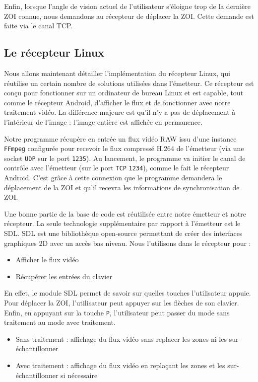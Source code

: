 \documentclass[11pt,a4paper]{article}
\begin{document}
\bigbreak
Enfin, lorsque l'angle de vision actuel de l'utilisateur s'éloigne trop de la dernière ZOI connue, nous demandons au récepteur de déplacer la ZOI.
Cette demande est faite via le canal TCP.

\subsection{Le récepteur Linux}
Nous allons maintenant détailler l'implémentation du récepteur Linux, qui réutilise un certain nombre de solutions utilisées dans l'émetteur.
Ce récepteur est conçu pour fonctionner sur un ordinateur de bureau Linux et est capable, tout comme le récepteur Android, d'afficher le flux et de fonctionner avec notre traitement vidéo.
La différence majeure est qu'il n'y a pas de déplacement à l'intérieur de l'image : l'image entière est affichée en permanence.

\bigbreak
Notre programme récupère en entrée un flux vidéo RAW issu d'une instance \texttt{FFmpeg} configurée pour recevoir le flux compressé H.264 de l'émetteur (via une socket \texttt{UDP} sur le port \texttt{1235}).
Au lancement, le programme va initier le canal de contrôle avec l'émetteur (sur le port \texttt{TCP} \texttt{1234}), comme le fait le récepteur Android.
C'est grâce à cette connexion que le programme demandera le déplacement de la ZOI et qu'il recevra les informations de synchronisation de ZOI.

\bigbreak
Une bonne partie de la base de code est réutilisée entre notre émetteur et notre récepteur.
La seule technologie supplémentaire par rapport à l'émetteur est le SDL.
SDL est une bibliothèque open-source permettant de créer des interfaces graphiques 2D avec un accès bas niveau.
Nous l'utilisons dans le récepteur pour :

\bigbreak
\begin{itemize}
\item{Afficher le flux vidéo}
\item{Récupérer les entrées du clavier}
\end{itemize}

\bigbreak
En effet, le module SDL permet de savoir sur quelles touches l'utilisateur appuie. 
Pour déplacer la ZOI, l'utilisateur peut appuyer sur les flèches de son clavier.
Enfin, en appuyant sur la touche \texttt{P}, l'utilisateur peut passer du mode sans traitement au mode avec traitement.

\bigbreak
\begin{itemize}
\item{Sans traitement : affichage du flux vidéo sans replacer les zones ni les sur-échantillonner}
\item{Avec traitement : affichage du flux vidéo en replaçant les zones et les sur-échantillonner si nécessaire}
\end{itemize}
\end{document}
